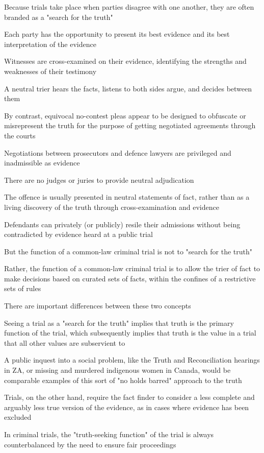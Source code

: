 Because trials take place when parties disagree with one another, they are often branded as a "search for the truth"

Each party has the opportunity to present its best evidence and its best interpretation of the evidence

Witnesses are cross-examined on their evidence, identifying the strengths and weaknesses of their testimony

A neutral trier hears the facts, listens to both sides argue, and decides between them

By contrast, equivocal no-contest pleas appear to be designed to obfuscate or misrepresent the truth for the purpose of getting negotiated agreements through the courts

Negotiations between prosecutors and defence lawyers are privileged and inadmissible as evidence

There are no judges or juries to provide neutral adjudication

The offence is usually presented in neutral statements of fact, rather than as a living discovery of the truth through cross-examination and evidence

Defendants can privately (or publicly) resile their admissions without being contradicted by evidence heard at a public trial

But the function of a common-law criminal trial is not to "search for the truth"

Rather, the function of a common-law criminal trial is to allow the trier of fact to make decisions based on curated sets of facts, within the confines of a restrictive sets of rules

There are important differences between these two concepts

Seeing a trial as a "search for the truth" implies that truth is the primary function of the trial, which subsequently implies that truth is the value in a trial that all other values are subservient to

A public inquest into a social problem, like the Truth and Reconciliation hearings in ZA, or missing and murdered indigenous women in Canada, would be comparable examples of this sort of "no holds barred" approach to the truth

Trials, on the other hand, require the fact finder to consider a less complete and arguably less true version of the evidence, as in cases where evidence has been excluded

In criminal trials, the "truth-seeking function" of the trial is always counterbalanced by the need to ensure fair proceedings

